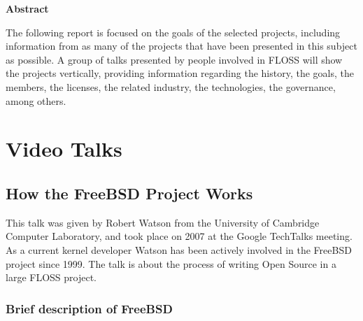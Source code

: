 \documentclass[11pt]{article} %
\begin{document}

\thispagestyle{empty}
{\bf \huge Abstract}

\vspace{10 mm}

The following report is focused on the goals of the selected projects, including information from as many of the projects that have been presented in this subject as possible. A group of talks presented by people involved in FLOSS will show the projects vertically, providing information regarding the history, the goals, the members, the licenses, the related industry, the technologies, the governance, among others.

\newpage


\tableofcontents %

\newpage


\section{Video Talks}


\subsection{How the FreeBSD Project Works}

This talk was given by Robert Watson from the University of Cambridge Computer Laboratory, and took place on 2007 at the Google TechTalks meeting. As a current kernel developer Watson has been actively involved in the FreeBSD project since 1999. The talk is about the process of writing Open Source in a large FLOSS project.


\subsubsection{Brief description of FreeBSD}
\end{document}
